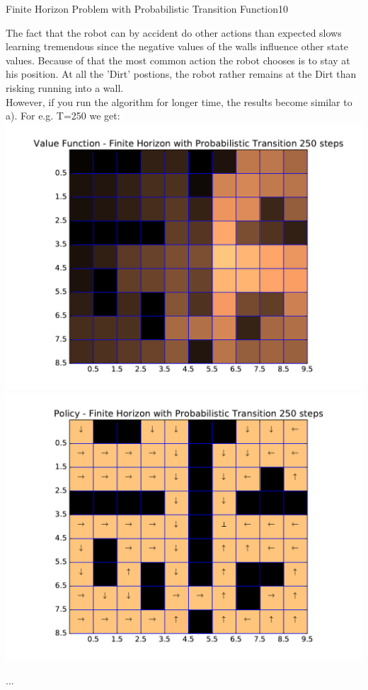 \begin{questions}
\begin{question}{Finite Horizon Problem with Probabilistic Transition Function}{10}
\begin{answer}
The fact that the robot can by accident do other actions than expected slows learning tremendous since the negative values of the walls influence other state values. Because of that the most common action the robot chooses is to stay at his position. At all the 'Dirt' postions, the robot rather remains at the Dirt than risking running into a wall.\\
However, if you run the algorithm for longer time, the results become similar to a). For e.g. T=250 we get: \\
\includegraphics[scale=0.4 ]{Gridworld/value_Fin_15_proof.pdf}
\includegraphics[scale=0.4 ]{Gridworld/policy_Fin_15_proof.pdf}


...


\end{answer}
\end{question}
\end{questions}
